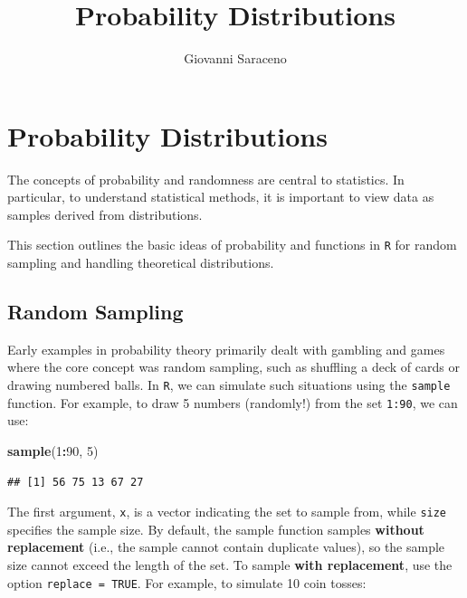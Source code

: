 \documentclass[
]{article}
\title{Probability Distributions}
\author{Giovanni Saraceno}
\date{}
\newenvironment{Shaded}{\begin{snugshade}}{\end{snugshade}}
\newcommand{\DecValTok}[1]{\textcolor[rgb]{0.00,0.00,0.81}{#1}}
\newcommand{\FunctionTok}[1]{\textcolor[rgb]{0.13,0.29,0.53}{\textbf{#1}}}
\newcommand{\NormalTok}[1]{#1}
\newcommand{\SpecialCharTok}[1]{\textcolor[rgb]{0.81,0.36,0.00}{\textbf{#1}}}
\begin{document}
\maketitle

{
\setcounter{tocdepth}{2}
\tableofcontents
}
\hypertarget{probability-distributions}{%
\section{Probability Distributions}\label{probability-distributions}}

The concepts of probability and randomness are central to statistics. In
particular, to understand statistical methods, it is important to view
data as samples derived from distributions.

This section outlines the basic ideas of probability and functions in
\texttt{R} for random sampling and handling theoretical distributions.

\hypertarget{random-sampling}{%
\subsection{Random Sampling}\label{random-sampling}}

Early examples in probability theory primarily dealt with gambling and
games where the core concept was random sampling, such as shuffling a
deck of cards or drawing numbered balls. In \texttt{R}, we can simulate
such situations using the \texttt{sample} function. For example, to draw
5 numbers (randomly!) from the set \texttt{1:90}, we can use:

\begin{Shaded}
\begin{Highlighting}[]
\FunctionTok{sample}\NormalTok{(}\DecValTok{1}\SpecialCharTok{:}\DecValTok{90}\NormalTok{, }\DecValTok{5}\NormalTok{)}
\end{Highlighting}
\end{Shaded}

\begin{verbatim}
## [1] 56 75 13 67 27
\end{verbatim}

The first argument, \texttt{x}, is a vector indicating the set to sample
from, while \texttt{size} specifies the sample size. By default, the
sample function samples \textbf{without replacement} (i.e., the sample
cannot contain duplicate values), so the sample size cannot exceed the
length of the set. To sample \textbf{with replacement}, use the option
\texttt{replace\ =\ TRUE}. For example, to simulate 10 coin tosses:
\end{document}
